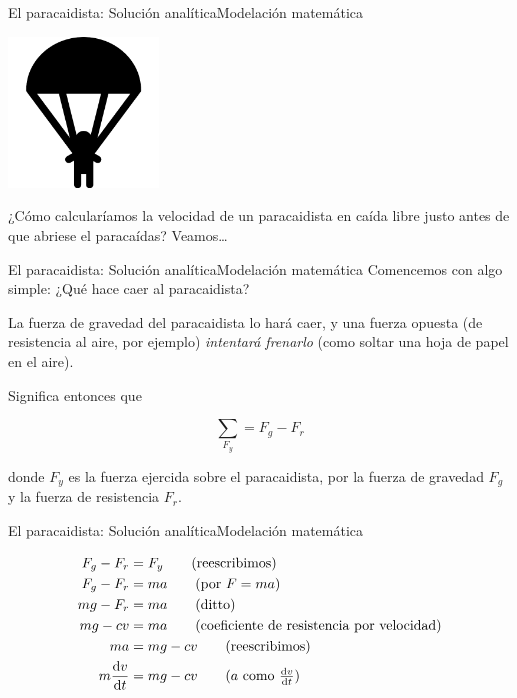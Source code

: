 \documentclass[spanish, c]{beamer}
\begin{document}
\begin{frame}{El paracaidista: Solución analítica}{Modelación matemática}

    \begin{center}
        \includegraphics[width=0.3\textwidth]{parachuter.png}
    \end{center}

    ¿Cómo calcularíamos la velocidad de un paracaidista en caída libre justo antes de que abriese el paracaídas? Veamos\dots

\end{frame}

\begin{frame}{El paracaidista: Solución analítica}{Modelación matemática}
    Comencemos con algo simple: ¿Qué hace caer al paracaidista? \pause

    La fuerza de gravedad del paracaidista lo hará caer, y una fuerza opuesta (de resistencia al aire, por ejemplo) \textit{intentará frenarlo} (como soltar una hoja de papel en el aire). \pause
    
    Significa entonces que

    $$\sum_{F_y} = F_g - F_r$$

    donde $F_y$ es la fuerza ejercida sobre el paracaidista, por la fuerza de gravedad $F_g$ y la fuerza de resistencia $F_r$.

\end{frame}

\begin{frame}{El paracaidista: Solución analítica}{Modelación matemática}

    \begin{align*}
        F_g - F_r & = F_y \tag{reescribimos} \\
        F_g - F_r & = ma \tag{por $F=ma$} \\
        mg - F_r & = ma \tag{ditto} \\
        mg - cv & = ma \tag{coeficiente de resistencia por velocidad} \\
        ma & = mg - cv \tag{reescribimos} \\
        m\dv{v}{t} & = mg - cv \tag{$a$ como $\dv{v}{t}$}
    \end{align*}

\end{frame}
\end{document}

